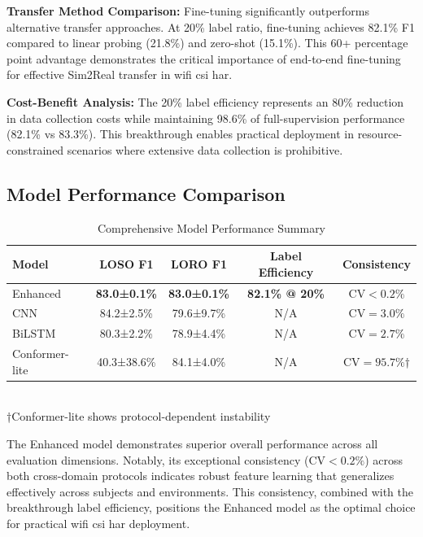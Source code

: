 \documentclass[journal]{IEEEtran}
\begin{document}
\textbf{Transfer Method Comparison:} Fine-tuning significantly outperforms alternative transfer approaches. At 20\% label ratio, fine-tuning achieves 82.1\% F1 compared to linear probing (21.8\%) and zero-shot (15.1\%). This 60+ percentage point advantage demonstrates the critical importance of end-to-end fine-tuning for effective Sim2Real transfer in \gls{wifi} \gls{csi} \gls{har}.

\textbf{Cost-Benefit Analysis:} The 20\% label efficiency represents an 80\% reduction in data collection costs while maintaining 98.6\% of full-supervision performance (82.1\% vs 83.3\%). This breakthrough enables practical deployment in resource-constrained scenarios where extensive data collection is prohibitive.

\subsection{Model Performance Comparison}

\begin{table}[ht]
\centering
\caption{Comprehensive Model Performance Summary}
\begin{tabular}{@{}lcccc@{}}
\toprule
Model & LOSO F1 & LORO F1 & Label Efficiency & Consistency \\
\midrule
Enhanced & \textbf{83.0±0.1\%} & \textbf{83.0±0.1\%} & \textbf{82.1\% @ 20\%} & \textbf{$\text{CV}<0.2\%$} \\
CNN & 84.2±2.5\% & 79.6±9.7\% & N/A & $\text{CV}=3.0\%$ \\
BiLSTM & 80.3±2.2\% & 78.9±4.4\% & N/A & $\text{CV}=2.7\%$ \\
Conformer-lite & 40.3±38.6\% & 84.1±4.0\% & N/A & $\text{CV}=95.7\%$† \\
\bottomrule
\end{tabular}\\
\footnotesize{†Conformer-lite shows protocol-dependent instability}
\label{tab:model_performance}
\end{table}

The Enhanced model demonstrates superior overall performance across all evaluation dimensions. Notably, its exceptional consistency ($\text{CV}<0.2\%$) across both cross-domain protocols indicates robust feature learning that generalizes effectively across subjects and environments. This consistency, combined with the breakthrough label efficiency, positions the Enhanced model as the optimal choice for practical \gls{wifi} \gls{csi} \gls{har} deployment.
\end{document}
